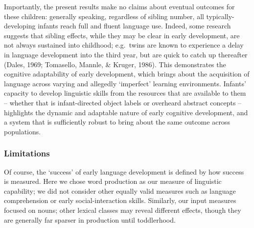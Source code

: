 \documentclass[
  man,mask,floatsintext]{apa6}
\begin{document}
Importantly, the present results make no claims about eventual outcomes for these children: generally speaking, regardless of sibling number, all typically-developing infants reach full and fluent language use. Indeed, some research suggests that sibling effects, while they may be clear in early development, are not always sustained into childhood; e.g.~twins are known to experience a delay in language development into the third year, but are quick to catch up thereafter (Dales, 1969; Tomasello, Mannle, \& Kruger, 1986). This demonstrates the cognitive adaptability of early development, which brings about the acquisition of language across varying and allegedly `imperfect' learning environments. Infants' capacity to develop linguistic skills from the resources that are available to them -- whether that is infant-directed object labels or overheard abstract concepts -- highlights the dynamic and adaptable nature of early cognitive development, and a system that is sufficiently robust to bring about the same outcome across populations.

\hypertarget{limitations}{%
\subsubsection{Limitations}\label{limitations}}

Of course, the `success' of early language development is defined by how success is measured. Here we chose word production as our measure of linguistic capability; we did not consider other equally valid measures such as language comprehension or early social-interaction skills. Similarly, our input measures focused on nouns; other lexical classes may reveal different effects, though they are generally far sparser in production until toddlerhood.
\end{document}
